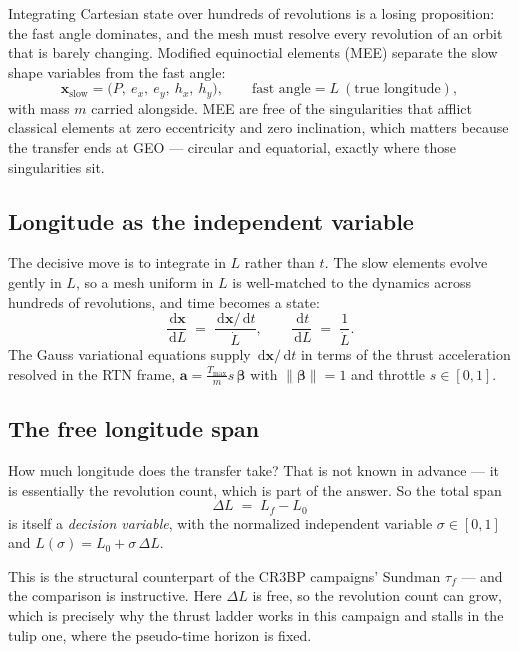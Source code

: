 \documentclass[11pt]{article}
\newcommand{\ud}{\,\mathrm{d}}
\newcommand{\vect}[1]{\bm{#1}}
\begin{document}
Integrating Cartesian state over hundreds of revolutions is a losing
proposition: the fast angle dominates, and the mesh must resolve every
revolution of an orbit that is barely changing. Modified equinoctial elements
(MEE) separate the slow shape variables from the fast angle:
\[
\vect{x}_{\text{slow}} = \big(P,\ e_x,\ e_y,\ h_x,\ h_y\big),
\qquad \text{fast angle} = L \ (\text{true longitude}),
\]
with mass $m$ carried alongside. MEE are free of the singularities that afflict
classical elements at zero eccentricity and zero inclination, which matters
because the transfer ends at GEO --- circular and equatorial, exactly where
those singularities sit.

\subsection{Longitude as the independent variable}

The decisive move is to integrate in $L$ rather than $t$. The slow elements
evolve gently in $L$, so a mesh uniform in $L$ is well-matched to the dynamics
across hundreds of revolutions, and time becomes a state:
\begin{equation}
\frac{\ud \vect{x}}{\ud L} \;=\; \frac{\ud \vect{x}/\ud t}{\dot L},
\qquad
\frac{\ud t}{\ud L} \;=\; \frac{1}{\dot L}.
\end{equation}
The Gauss variational equations supply $\ud\vect{x}/\ud t$ in terms of the
thrust acceleration resolved in the RTN frame, $\vect{a}=\frac{T_{\max}}{m}s\,
\vect{\beta}$ with $\|\vect{\beta}\|=1$ and throttle $s\in[0,1]$.

\subsection{The free longitude span}

How much longitude does the transfer take? That is not known in advance --- it
is essentially the revolution count, which is part of the answer. So the total
span
\begin{equation}
\Delta L \;=\; L_f - L_0
\end{equation}
is itself a \emph{decision variable}, with the normalized independent variable
$\sigma\in[0,1]$ and $L(\sigma)=L_0+\sigma\,\Delta L$.

This is the structural counterpart of the CR3BP campaigns' Sundman
$\tau_f$ --- and the comparison is instructive. Here $\Delta L$ is free, so the
revolution count can grow, which is precisely why the thrust ladder works in
this campaign and stalls in the tulip one, where the pseudo-time horizon is
fixed.
\end{document}

